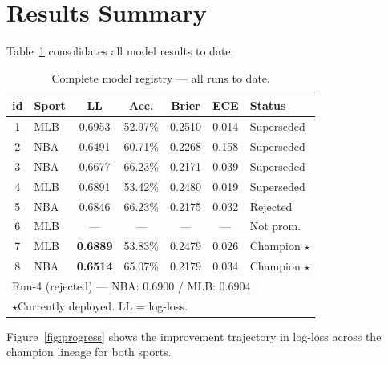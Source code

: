 \documentclass[conference]{IEEEtran}
\begin{document}
\section{Results Summary}
\label{sec:results}

Table~\ref{tab:allresults} consolidates all model results to date.

\begin{table}[t]
\centering
\caption{Complete model registry — all runs to date.}
\label{tab:allresults}
\small
\begin{tabular}{clccccl}
\toprule
\textbf{id} & \textbf{Sport} & \textbf{LL} & \textbf{Acc.} & \textbf{Brier} & \textbf{ECE} & \textbf{Status} \\
\midrule
1  & MLB & 0.6953 & 52.97\% & 0.2510 & 0.014 & Superseded \\
2  & NBA & 0.6491 & 60.71\% & 0.2268 & 0.158 & Superseded \\
3  & NBA & 0.6677 & 66.23\% & 0.2171 & 0.039 & Superseded \\
4  & MLB & 0.6891 & 53.42\% & 0.2480 & 0.019 & Superseded \\
5  & NBA & 0.6846 & 66.23\% & 0.2175 & 0.032 & Rejected \\
6  & MLB & —     & —      & —      & —     & Not prom. \\
7  & MLB & \textbf{0.6889} & 53.83\% & 0.2479 & 0.026 & Champion $\star$ \\
8  & NBA & \textbf{0.6514} & 65.07\% & 0.2179 & 0.034 & Champion $\star$ \\
\midrule
\multicolumn{7}{l}{Run-4 (rejected) — NBA: 0.6900 / MLB: 0.6904} \\
\bottomrule
\multicolumn{7}{l}{$\star$Currently deployed.  LL = log-loss.}
\end{tabular}
\end{table}

Figure~\ref{fig:progress} shows the improvement trajectory in
log-loss across the champion lineage for both sports.
\end{document}
